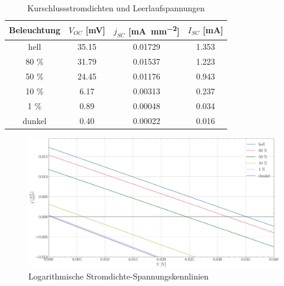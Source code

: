 \documentclass[12pt,a4paper,ngerman]{report}
\begin{document}
\begin{table}[h!]
	\centering
	\begin{tabular}{c c c c}
		\toprule[1.5pt]
		Beleuchtung & $V_{OC}$ [\si{\milli \volt}] & $j_{SC}$ [\si{\milli \ampere \per \milli \meter \squared}] & $I_{SC}$ [\si{\milli \ampere}] \\
		\midrule
		hell        & 35.15  &  0.01729  & 1.353      \\
		80 \%       & 31.79  &  0.01537  & 1.223            \\
		50 \%       & 24.45  &  0.01176  & 0.943            \\
		10 \%       & 6.17   &  0.00313  & 0.237          \\
		1  \%       & 0.89   &  0.00048  & 0.034          \\
		dunkel      & 0.40   &  0.00022  & 0.016          \\
		\bottomrule[1.5pt]
	\end{tabular}
	\caption{Kurschlussstromdichten und Leerlaufspannungen}\label{table:KurzschlussLeerlauf}
\end{table}
\begin{figure} 
	\centering
	\includegraphics[width=\textwidth]{Bilder/KennlinienLOG.pdf}
	\caption{Logarithmische Stromdichte-Spannungskennlinien}
	\label{img:KennlinienLOG}
\end{figure}
\end{document}
